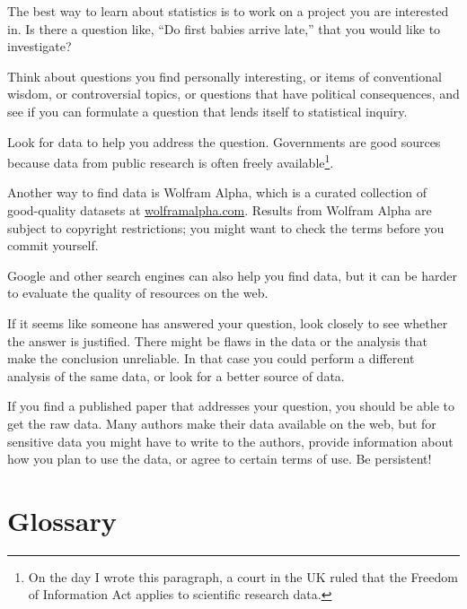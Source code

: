 \documentclass[12pt]{book}
\begin{document}
\begin{ex}

The best way to learn about statistics is to work on a project you are
interested in.  Is there a question like, ``Do first babies arrive
late,'' that you would like to investigate?

Think about questions you find personally interesting, or items of
conventional wisdom, or controversial topics, or questions that have
political consequences, and see if you can formulate a question that
lends itself to statistical inquiry.

Look for data to help you address the question.  Governments are good
sources because data from public research is often freely
available\footnote{On the day I wrote this paragraph, a court in the
  UK ruled that the Freedom of Information Act applies to scientific
  research data.}.

Another way to find data is Wolfram Alpha, which is a curated
collection of good-quality datasets at \url{wolframalpha.com}.
Results from Wolfram Alpha are subject to copyright
restrictions; you might want to check the terms before you commit
yourself.

Google and other search engines can also help you find data, but it
can be harder to evaluate the quality of resources on the web.

If it seems like someone has answered your question, look closely to
see whether the answer is justified.  There might be flaws in the data
or the analysis that make the conclusion unreliable.  In that case you
could perform a different analysis of the same data, or look for a
better source of data.

If you find a published paper that addresses your question, you
should be able to get the raw data.  Many authors make their data
available on the web, but for sensitive data you might have to
write to the authors, provide information about how you plan to use
the data, or agree to certain terms of use.  Be persistent!

\end{ex}


\section{Glossary}
\end{document}
